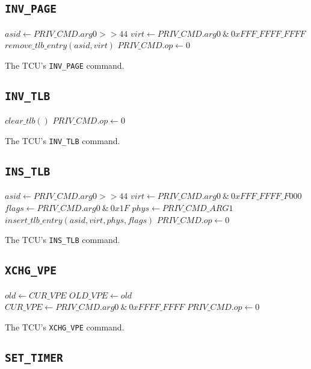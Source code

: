 \subsection{\texttt{INV\_PAGE}}

\begin{algorithm}[H]
    $asid \gets PRIV\_CMD.arg0 >> 44$\;
    $virt \gets PRIV\_CMD.arg0\ \&\ 0xFFF\_FFFF\_FFFF$\;
    \BlankLine
    $remove\_tlb\_entry(asid, virt)$\;
    $PRIV\_CMD.op \gets 0$\;
    \caption{The TCU's \texttt{INV\_PAGE} command.}
\end{algorithm}

\subsection{\texttt{INV\_TLB}}

\begin{algorithm}[H]
    $clear\_tlb()$\;
    $PRIV\_CMD.op \gets 0$\;
    \caption{The TCU's \texttt{INV\_TLB} command.}
\end{algorithm}

\subsection{\texttt{INS\_TLB}}

\begin{algorithm}[H]
    $asid \gets PRIV\_CMD.arg0 >> 44$\;
    $virt \gets PRIV\_CMD.arg0\ \&\ 0xFFF\_FFFF\_F000$\;
    $flags \gets PRIV\_CMD.arg0\ \&\ 0x1F$\;
    $phys \gets PRIV\_CMD\_ARG1$\;
    \BlankLine
    $insert\_tlb\_entry(asid, virt, phys, flags)$\;
    $PRIV\_CMD.op \gets 0$\;
    \caption{The TCU's \texttt{INS\_TLB} command.}
\end{algorithm}
\extend{}

\subsection{\texttt{XCHG\_VPE}}

\begin{algorithm}[H]
    $old \gets CUR\_VPE$\;
    $OLD\_VPE \gets old$\;
    $CUR\_VPE \gets PRIV\_CMD.arg0\ \&\ 0xFFFF\_FFFF$\;
    \BlankLine
    $PRIV\_CMD.op \gets 0$\;
    \caption{The TCU's \texttt{XCHG\_VPE} command.}
\end{algorithm}

\subsection{\texttt{SET\_TIMER}}

